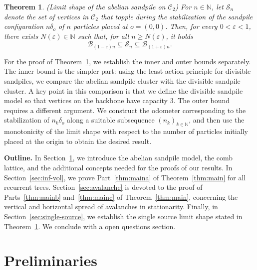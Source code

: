 \documentclass[11pt]{article}
\newtheorem{theorem}{Theorem}[section]
\begin{document}
\begin{theorem}\label{thm:main2}(Limit shape of the abelian sandpile on $\mathcal{C}_2$)
 For $n\in\mathbb{N}$,  let $\mathcal{S}_n $ denote the set of vertices in $\mathcal{C}_2$ that topple during the stabilization of the sandpile configuration $n\delta_o$  of $n$ particles placed at $o=(0,0)$. Then, for every \(0<\varepsilon<1\), there exists \(N(\varepsilon)\in\mathbb{N}\) such that, for all \(n\ge N(\varepsilon)\), it holds
\[
\mathcal{B}_{(1-\varepsilon)n}\subseteq \mathcal{S}_n\subseteq \mathcal{B}_{(1+\varepsilon)n}.
\]
\end{theorem}
For the proof of Theorem~\ref{thm:main2}, we establish the inner and outer bounds separately. The inner bound is the simpler part: using the least action principle for divisible sandpiles, we compare the abelian sandpile cluster with the divisible sandpile cluster. A key point in this comparison is that we define the divisible sandpile model so that vertices on the backbone have capacity $3$. The outer bound requires a different argument. We construct the odometer corresponding to the stabilization of $n_k\delta_o$ along a suitable subsequence $(n_k)_{k\in\mathbb{N}}$, and then use the monotonicity of the limit shape with respect to the number of particles initially placed at the origin to obtain the desired result.

\textbf{Outline.} 
In Section~\ref{sec:preliminaries}, we introduce the abelian sandpile model, the comb lattice, and the additional concepts needed for the proofs of our results. In Section~\ref{sec:inf-vol}, we prove Part~\ref{thm:maina} of Theorem~\ref{thm:main} for all recurrent trees. Section~\ref{sec:avalanche} is devoted to the proof of Parts~\ref{thm:mainb} and~\ref{thm:mainc} of Theorem~\ref{thm:main}, concerning the vertical and horizontal spread of avalanches in stationarity. Finally, in Section~\ref{sec:single-source}, we establish the single source limit shape stated in Theorem~\ref{thm:main2}. We conclude with a open questions section.

\section{Preliminaries}
\label{sec:preliminaries}
\end{document}
